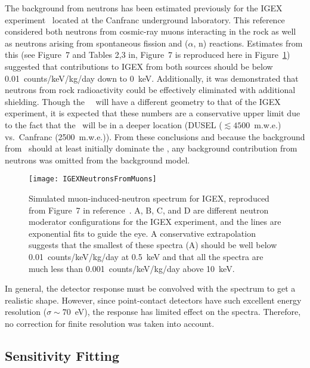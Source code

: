 	The background from neutrons has been estimated previously for the IGEX experiment~\cite{Carmona2004523} located at the Canfranc underground laboratory.  This reference considered both neutrons from cosmic-ray muons interacting in the rock as well as neutrons arising from spontaneous fission and ($\alpha$, n) reactions.  Estimates from this (see Figure~7 and Tables 2,3 in\cite{Carmona2004523}, Figure~7 is reproduced here in Figure~\ref{fig:IGEXNeutrons}) suggested that contributions to IGEX from both sources should be below 0.01~counts/keV/kg/day down to 0~keV.  Additionally, it was demonstrated that neutrons from rock radioactivity could be effectively eliminated with additional shielding.  Though the \MJ~\minmod~will have a different geometry to that of the IGEX experiment, it is expected that these numbers are a conservative upper limit due to the fact that the \minmod~will be in a deeper location (DUSEL ($\lesssim4500$~m.w.e.) vs.~Canfranc (2500~m.w.e.)).  From these conclusions and because the background from \hthree~should at least initially dominate the \minmod, any background contribution from neutrons was omitted from the background model.
	
			\begin{figure}
				\centering
				\texttt{[image: IGEXNeutronsFromMuons]}
				\caption[Simulated muon-induced-neutron spectrum for IGEX.]{Simulated muon-induced-neutron 
				spectrum for IGEX, reproduced from Figure~7 in reference~\cite{Carmona2004523}.  A, B, C, and D are different
				neutron moderator configurations for the IGEX experiment, and the lines are exponential fits to guide the eye.
				A conservative extrapolation suggests that the smallest of these spectra (A) 
				should be well below 0.01~counts/keV/kg/day at
				0.5~keV and that all the spectra are much less than 0.001~counts/keV/kg/day above 10~keV.}
				\label{fig:IGEXNeutrons}
			\end{figure}
	
	In general, the detector response must be convolved with the spectrum to get a realistic shape.  However, since point-contact detectors have such excellent energy resolution ($\sigma\sim70$~eV), the response has limited effect on the spectra.  Therefore, no correction for finite resolution was taken into account.  

		\subsection{Sensitivity Fitting}
		\label{sec:MJSensitivityFitting}
	
